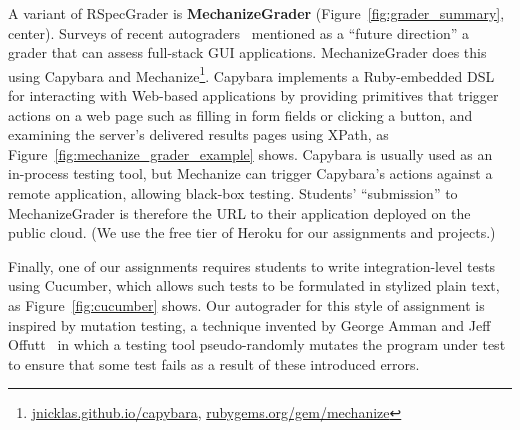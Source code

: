 A variant of RSpecGrader is \textbf{MechanizeGrader}  (Figure~\ref{fig:grader_summary}, center).
Surveys of recent
autograders~\cite{ihantola-2010-autograding-survey,douce-2005-autograding-survey}
mentioned as a ``future direction'' a grader that can assess full-stack
GUI applications.
MechanizeGrader does this using Capybara and
Mechanize\footnote{\url{jnicklas.github.io/capybara},
\url{rubygems.org/gem/mechanize}}.
Capybara implements a Ruby-embedded DSL for interacting with Web-based
applications by providing primitives that trigger actions on a web page
such as filling in form fields or clicking a button, and examining the
server's delivered results pages using XPath, as
Figure~\ref{fig:mechanize_grader_example} shows. 
Capybara is usually used as an in-process testing tool, but Mechanize
can trigger Capybara's actions against a remote application, allowing
black-box testing.
Students' ``submission'' to MechanizeGrader is therefore the URL to their
application deployed on the public 
cloud.  (We use the free tier of Heroku for our assignments and
projects.)

Finally, one of our assignments requires students to write integration-level
tests using Cucumber, which allows such tests to be formulated in
stylized plain text, as Figure~\ref{fig:cucumber} shows.
Our autograder for this
style of assignment is inspired by mutation testing, a technique invented
by George Amman and Jeff 
Offutt~\cite{ammann-offutt-sw-testing} in which a
testing tool pseudo-randomly mutates the program under test to ensure
that some test fails as a result of these introduced errors.


